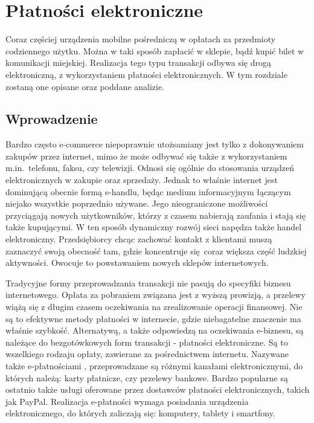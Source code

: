 \section{Płatności elektroniczne}
Coraz częściej urządzenia mobilne pośredniczą w opłatach za przedmioty codziennego użytku. Można w taki sposób zapłacić w sklepie, bądź kupić bilet w komunikacji miejskiej. Realizacja tego typu transakcji odbywa się drogą elektroniczną, z wykorzystaniem płatności elektronicznych. W tym rozdziale zostaną one opisane oraz poddane analizie.

\subsection{Wprowadzenie}

Bardzo często e-commerce niepoprawnie utożsamiany jest tylko z dokonywaniem zakupów przez internet, mimo że może odbywać się także z wykorzystaniem m.in.~telefonu, faksu, czy telewizji. Odnosi się ogólnie do stosowania urządzeń elektronicznych w zakupie oraz sprzedaży. Jednak to właśnie internet jest dominującą obecnie formą e-handlu, będąc medium informacyjnym łączącym niejako wszystkie poprzednio używane. Jego nieograniczone możliwości przyciągają nowych użytkowników, którzy z czasem nabierają zaufania i stają się także kupującymi. W ten sposób dynamiczny rozwój sieci napędza także handel elektroniczny. Przedsiębiorcy chcąc zachować kontakt z klientami muszą zaznaczyć swoją obecność tam, gdzie koncentruje się coraz większa część ludzkiej aktywności. Owocuje to powstawaniem nowych sklepów internetowych.

Tradycyjne formy przeprowadzania transakcji nie pasują do specyfiki biznesu internetowego. Opłata za pobraniem związana jest z wyższą prowizją, a przelewy wiążą się z długim czasem oczekiwania na zrealizowanie operacji finansowej. Nie są to efektywne metody płatności w internecie, gdzie niebagatelne znaczenie ma właśnie szybkość. Alternatywą, a także odpowiedzą na oczekiwania e-biznesu, są należące do bezgotówkowych form transakcji - płatności elektroniczne. Są to wszelkiego rodzaju opłaty, zawierane za pośrednictwem internetu. Nazywane także e-płatnościami \cite{elektroniczne_metody_platnosci}, przeprowadzane są różnymi kanałami elektronicznymi, do których należą: karty płatnicze, czy przelewy bankowe. Bardzo popularne są ostatnio także usługi oferowane przez dostawców płatności elektronicznych, takich jak PayPal. Realizacja e-płatności wymaga posiadania urządzenia elektronicznego, do których zaliczają się: komputery, tablety i smartfony. 

